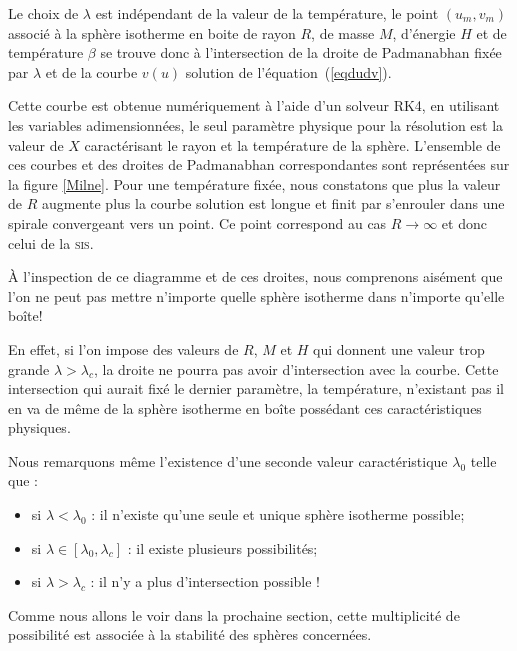 	Le choix de $\lambda$ est indépendant de la valeur de la température, le point $(u_m,v_m)$ associé à la sphère
	isotherme en boite de rayon $R$, de masse $M$, d'énergie $H$ et de température $\beta$ se trouve donc à
	l'intersection de la droite de Padmanabhan fixée par $\lambda$ et de la courbe $v(u)$ solution de
	l'équation~(\ref{eqdudv}). 
	
	
	Cette courbe est obtenue numériquement à l'aide d'un solveur RK4, en utilisant les variables adimensionnées, le
	seul paramètre physique pour la résolution est la valeur de $X$ caractérisant le rayon et la température de la
	sphère.  L'ensemble de ces courbes et des droites de Padmanabhan correspondantes sont représentées sur la figure
	\ref{Milne}. Pour une température fixée, nous constatons que plus la valeur de $R$ augmente plus la courbe
	solution est longue et finit par s'enrouler dans une spirale convergeant vers un point. Ce point correspond au
	cas $R\to\infty$ et donc celui de la \textsc{sis}.
	
	À l'inspection de ce diagramme et de ces droites, nous comprenons aisément que l'on ne peut pas mettre
	n'importe quelle sphère isotherme dans n'importe qu'elle boîte!

	En effet, si l'on impose des valeurs de $R$,
	$M$ et $H$ qui donnent une valeur trop grande $\lambda>\lambda_c$, la droite ne pourra pas avoir d'intersection
	avec la courbe. Cette intersection qui aurait fixé le dernier paramètre, la température, n'existant pas il en va
	de même de la sphère isotherme en boîte possédant ces caractéristiques physiques.
	
	Nous remarquons même l'existence d'une seconde valeur caractéristique $\lambda_0$ telle que :
	\begin{itemize}
		\item si $\lambda < \lambda_0$ : il n'existe qu'une seule et unique sphère isotherme possible;
		\item si $\lambda \in \left[\lambda_0,\lambda_c\right]$ : il existe plusieurs possibilités;
		\item si $\lambda > \lambda_c$ : il n'y a plus d'intersection possible !
	\end{itemize}

Comme nous allons le voir dans la prochaine section, cette multiplicité de possibilité est associée à la stabilité des sphères concernées.

